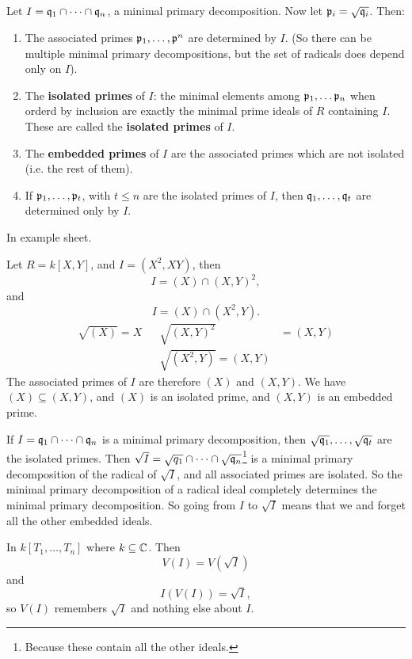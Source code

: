 \documentclass{article}
\begin{document}
\begin{fancythm}{}
    Let $I = \mathfrak{q}_{1} \cap \dots \cap \mathfrak{q}_{n}$, a minimal primary decomposition. Now let $\mathfrak{p}_{i} = \sqrt{\mathfrak{q}_{i}}$. Then: \begin{enumerate}
        \item The associated primes $\mathfrak{p}_{1}, \dots, \mathfrak{p}^{n}$ are determined by $I$. (So there can be multiple minimal primary decompositions, but the set of radicals does depend only on $I$).
        \item The \textbf{isolated primes} of $I$: the minimal elements among $\mathfrak{p}_{1}, \dots \mathfrak{p}_{n}$ when orderd by inclusion are exactly the minimal prime ideals of $R$ containing $I$. These are called the \textbf{isolated primes} of $I$.
        \item The \textbf{embedded primes} of $I$ are the associated primes which are not isolated (i.e. the rest of them).
        \item If $\mathfrak{p}_{1}, \dots, \mathfrak{p}_{t}$, with $t \leq n$ are the isolated primes of $I$, then $\mathfrak{q}_{1}, \dots, \mathfrak{q}_{t}$ are determined only by $I$.
    \end{enumerate}
\end{fancythm}
\proof In example sheet.
\begin{ex*}
    Let $R = k[X,Y]$, and $I=(X^{2},XY)$, then \[I = (X) \cap (X,Y)^{2},\] and \[I=(X) \cap (X^{2},Y).\]
    \begin{align*}
        \sqrt{(X)} = X & & \sqrt{(X,Y)^{2}} &= (X,Y)\\
         & & \sqrt{(X^{2},Y)}=(X,Y)
    \end{align*}
    The associated primes of $I$ are therefore $(X)$ and $(X,Y)$. We have $(X) \subseteq (X,Y)$, and $(X)$ is an isolated prime, and $(X,Y)$ is an embedded prime.
\end{ex*}
If $I = \mathfrak{q}_{1} \cap \dots \cap \mathfrak{q}_{n}$ is a minimal primary decomposition, then $\sqrt{\mathfrak{q}_{1}}, \dots, \sqrt{\mathfrak{q}_{t}}$ are the isolated primes. Then $\sqrt{I}= \sqrt{q_{1}} \cap \dots \cap \sqrt{\mathfrak{q}_{n}}$\footnote{Because these contain all the other ideals.} is a minimal primary decomposition of the radical of $\sqrt{I}$, and all associated primes are isolated. So the minimal primary decomposition of a radical ideal completely determines the minimal primary decomposition. So going from $I$ to $\sqrt{I}$ means that we  and forget all the other embedded ideals. 
\begin{ex*}
    In $k[T_{1}, \dots, T_{n}]$ where $k \subseteq \mathbb{C}$. Then \[ V(I) = V(\sqrt{I})\] and \[ I(V(I)) = \sqrt{I},\] so $V(I)$ remembers $\sqrt{I}$ and nothing else about $I$.
\end{ex*}
\end{document}

